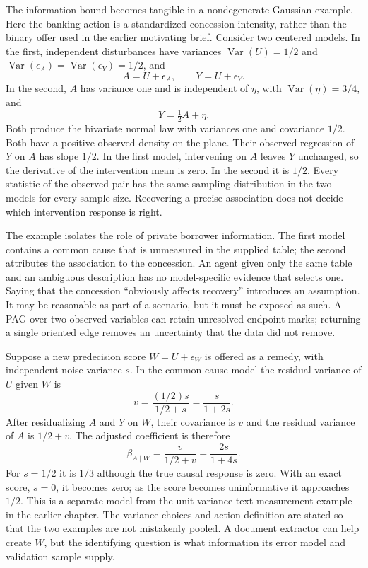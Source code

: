 The information bound becomes tangible in a nondegenerate Gaussian example.
Here the banking action is a standardized concession intensity, rather than the
binary offer used in the earlier motivating brief. Consider two centered models.
In the first, independent disturbances have variances
$\operatorname{Var}(U)=1/2$ and
$\operatorname{Var}(\epsilon_A)=\operatorname{Var}(\epsilon_Y)=1/2$, and
\[
 A=U+\epsilon_A,\qquad Y=U+\epsilon_Y.
\]
In the second, $A$ has variance one and is independent of $\eta$, with
$\operatorname{Var}(\eta)=3/4$, and
\[
 Y=\tfrac12 A+\eta.
\]
Both produce the bivariate normal law with variances one and covariance $1/2$.
Both have a positive observed density on the plane. Their observed regression
of $Y$ on $A$ has slope $1/2$. In the first model, intervening on $A$ leaves
$Y$ unchanged, so the derivative of the intervention mean is zero. In the
second it is $1/2$. Every statistic of the observed pair has the same sampling
distribution in the two models for every sample size. Recovering a precise
association does not decide which intervention response is right.

The example isolates the role of private borrower information. The first model
contains a common cause that is unmeasured in the supplied table; the second
attributes the association to the concession. An agent given only the same
table and an ambiguous description has no model-specific evidence that selects
one. Saying that the concession ``obviously affects recovery'' introduces an
assumption. It may be reasonable as part of a scenario, but it must be exposed
as such. A PAG over two observed variables can retain unresolved endpoint marks;
returning a single oriented edge removes an uncertainty that the data did not
remove.

Suppose a new predecision score $W=U+\epsilon_W$ is offered as a remedy, with
independent noise variance $s$. In the common-cause model the residual variance
of $U$ given $W$ is
\[
 v=\frac{(1/2)s}{1/2+s}=\frac{s}{1+2s}.
\]
After residualizing $A$ and $Y$ on $W$, their covariance is $v$ and the residual
variance of $A$ is $1/2+v$. The adjusted coefficient is therefore
\[
 \beta_{A\mid W}=\frac{v}{1/2+v}=\frac{2s}{1+4s}.
\]
For $s=1/2$ it is $1/3$ although the true causal response is zero. With an exact
score, $s=0$, it becomes zero; as the score becomes uninformative it approaches
$1/2$. This is a separate model from the unit-variance text-measurement example
in the earlier chapter. The variance choices and action definition are stated
so that the two examples are not mistakenly pooled. A document extractor can
help create $W$, but the identifying question is what information its error
model and validation sample supply.

